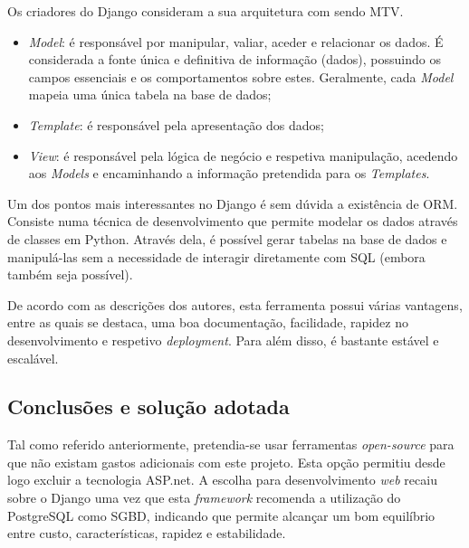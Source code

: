 Os criadores do Django consideram a sua arquitetura com sendo \ac{MTV}\cite{Index}. 

\begin{itemize}
	\item \textit{Model}: é responsável por manipular, valiar, aceder e relacionar os dados. É considerada a fonte única e definitiva de informação (dados), possuindo os campos essenciais e os comportamentos sobre estes. Geralmente, cada \textit{Model} mapeia uma única tabela na base de dados;
	
	
	\item \textit{Template}: é responsável pela apresentação dos dados; 

	\item \textit{View}: é responsável pela lógica de negócio e respetiva manipulação, acedendo aos \textit{Models} e encaminhando a informação pretendida para os \textit{Templates}. 
	
\end{itemize}




Um dos pontos mais interessantes no Django é sem dúvida a existência de \linebreak \ac{ORM}. Consiste numa técnica de desenvolvimento que permite modelar os dados através de classes em Python. Através dela, é possível gerar tabelas na base de dados e manipulá-las sem a necessidade de interagir diretamente com \ac{SQL} (embora também seja possível).

De acordo com as descrições dos autores, esta ferramenta possui várias vantagens, entre as quais se destaca, uma boa documentação, facilidade, rapidez no desenvolvimento e respetivo \textit{deployment}. Para além disso, é bastante estável e escalável\cite{Index}. 











\subsection{Conclusões e solução adotada}
\label{django-conclusao}

Tal como referido anteriormente, pretendia-se usar ferramentas \textit{open-source} para que não existam gastos adicionais com este projeto. Esta opção permitiu desde logo excluir a tecnologia ASP.net. A escolha para desenvolvimento \textit{web} recaiu sobre o Django uma vez que esta \textit{framework} recomenda a utilização do PostgreSQL como \ac{SGBD}, indicando que permite alcançar um bom equilíbrio entre custo, características, rapidez e estabilidade\cite{Holovaty2009}. 








